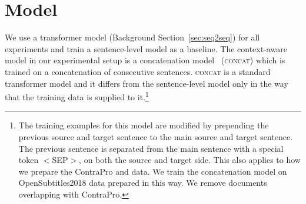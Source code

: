 \section{Model}
\label{sec:contracatmodel}


We use a transformer model (Background Section~\ref{sec:seq2seq}) for all experiments and train a sentence-level model as a baseline.
%
The context-aware model in our experimental setup is 
a concatenation model~\citep{tiedemann2017neural} (\textsc{concat}) which is trained on a concatenation of consecutive sentences.
%
\textsc{concat} is a standard transformer model and it differs from the sentence-level model only in the way that the training data is supplied to it.\footnote{The training examples for this model are modified by prepending the previous source and target sentence to the main source and target sentence. 
	The previous sentence is separated from the main sentence with a special token $<$SEP$>$, on both the source and target side. 
	This also applies to how we prepare the ContraPro and \contracat{} data. 
	We train the concatenation model on OpenSubtitles2018 data prepared in this way. 
	We remove documents overlapping with ContraPro.}
%


